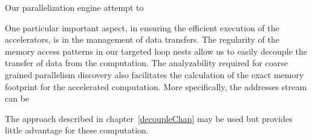  



Our parallelization engine attempt to  

One particular important aspect, in ensuring the efficient execution of the accelerators, is in the management of data transfers. 
The regularity of the memory access patterns in our targeted loop nests
allow us  to easily decouple the transfer of data from the computation. 
The analyzability required for coarse grained parallelism discovery also
facilitates the calculation of the exact memory footprint for the accelerated computation. More specifically, the addresses stream can be 


The approach described in chapter~\ref{decoupleChap} may be used but provides little advantage for these computation. 

